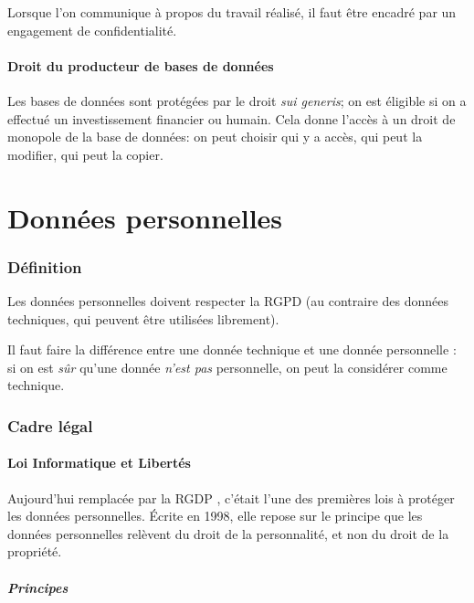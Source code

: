 \documentclass[10pt,a4paper,french]{article}
\begin{document}
Lorsque l'on communique à propos du travail réalisé, il faut être encadré par un engagement de confidentialité.

\subsection{Droit du producteur de bases de données}

Les bases de données sont protégées par le droit \textit{sui generis}; on est éligible si on a effectué un investissement financier ou humain. Cela donne l'accès à un droit de monopole de la base de données: on peut choisir qui y a accès, qui peut la modifier, qui peut la copier.

\part{Données personnelles}

\section{Définition}

Les données personnelles doivent respecter la RGPD (au contraire des données techniques, qui peuvent être utilisées librement).

Il faut faire la différence entre une donnée technique et une donnée personnelle : si on est \textit{sûr} qu'une donnée \textit{n'est pas} personnelle, on peut la considérer comme technique.

\section{Cadre légal}

\subsection{Loi Informatique et Libertés}
Aujourd'hui remplacée par la RGDP , c'était l'une des premières lois à protéger les données personnelles. Écrite en 1998, elle repose sur le principe que les données personnelles relèvent du droit de la personnalité, et non du droit de la propriété.

\subsubsection{Principes}
\end{document}
